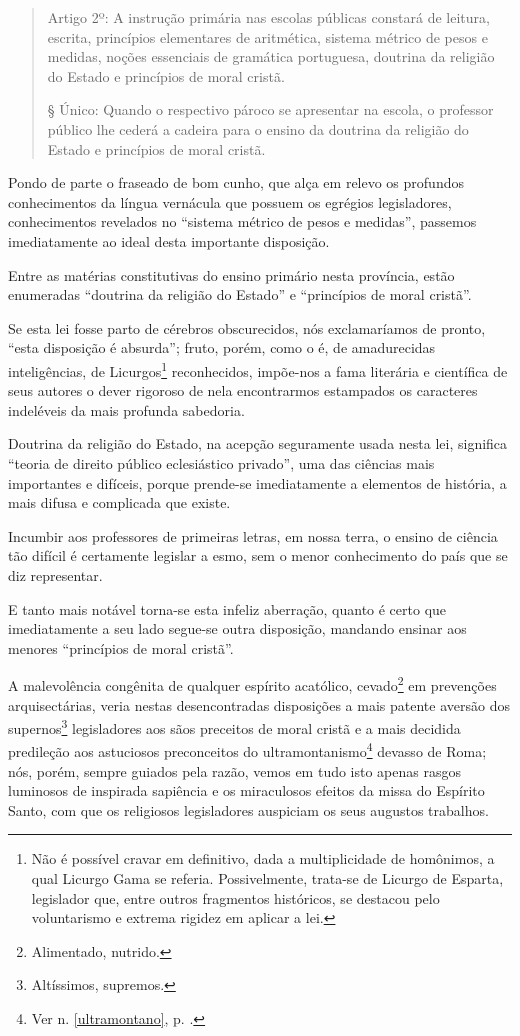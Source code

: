\begin{quote}
Artigo 2º: A instrução primária nas escolas públicas constará de
leitura, escrita, princípios elementares de aritmética, sistema métrico
de pesos e medidas, noções essenciais de gramática portuguesa, doutrina
da religião do Estado e princípios de moral cristã.

§ Único: Quando o respectivo pároco se apresentar na escola, o professor
público lhe cederá a cadeira para o ensino da doutrina da religião do
Estado e princípios de moral cristã.
\end{quote}

Pondo de parte o fraseado de bom cunho, que alça em relevo os profundos
conhecimentos da língua vernácula que possuem os egrégios legisladores,
conhecimentos revelados no ``sistema métrico de pesos e medidas'',
passemos imediatamente ao ideal desta importante disposição.

Entre as matérias constitutivas do ensino primário nesta província,
estão enumeradas ``doutrina da religião do Estado'' e ``princípios de moral
cristã''.

Se esta lei fosse parto de cérebros obscurecidos, nós exclamaríamos de
pronto, ``esta disposição é absurda''; fruto, porém, como o é, de
amadurecidas inteligências, de Licurgos\footnote{Não é possível cravar \label{licurgo}
  em definitivo, dada a multiplicidade de homônimos, a qual Licurgo Gama
  se referia. Possivelmente, trata-se de Licurgo de Esparta, legislador
  que, entre outros fragmentos históricos, se destacou pelo voluntarismo
  e extrema rigidez em aplicar a lei.} reconhecidos, impõe-nos a fama
literária e científica de seus autores o dever rigoroso de nela
encontrarmos estampados os caracteres indeléveis da mais profunda
sabedoria.

Doutrina da religião do Estado, na acepção seguramente usada nesta lei,
significa ``teoria de direito público eclesiástico privado'', uma das
ciências mais importantes e difíceis, porque prende-se imediatamente a
elementos de história, a mais difusa e complicada que existe.

Incumbir aos professores de primeiras letras, em nossa terra, o ensino
de ciência tão difícil é certamente legislar a esmo, sem o menor
conhecimento do país que se diz representar.

E tanto mais notável torna-se esta infeliz aberração, quanto é certo que
imediatamente a seu lado segue-se outra disposição, mandando ensinar aos
menores ``princípios de moral cristã''.

A malevolência congênita de qualquer espírito acatólico,
cevado\footnote{Alimentado, nutrido.} em prevenções arquisectárias,
veria nestas desencontradas disposições a mais patente aversão dos
supernos\footnote{Altíssimos, supremos.} legisladores aos sãos
preceitos de moral cristã e a mais decidida predileção aos astuciosos
preconceitos do ultramontanismo\footnote{Ver n. \ref{ultramontano}, p. 
\pageref{ultramontano}.} devasso de Roma; nós, porém, sempre guiados pela 
razão, vemos em tudo isto apenas rasgos luminosos de
inspirada sapiência e os miraculosos efeitos da missa do Espírito Santo,
com que os religiosos legisladores auspiciam os seus augustos trabalhos.

